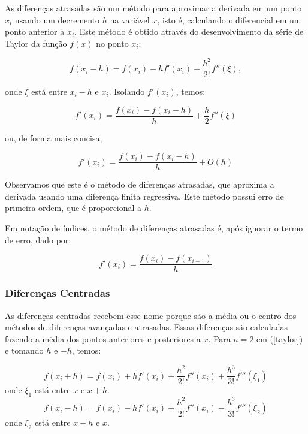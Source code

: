 As diferenças atrasadas são um método para aproximar a derivada em um ponto $x_i$ usando um decremento $h$ na variável $x$, isto é, calculando o diferencial em um ponto anterior a $x_i$. Este método é obtido através do desenvolvimento da série de Taylor da função $f(x)$ no ponto $x_i$:

\begin{equation*}
f(x_i-h)= f(x_i)- hf'(x_i) + \frac{h^2}{2!}f''(\xi),
\end{equation*}

onde $\xi$ está entre $x_i-h$ e $x_i$. Isolando $f'(x_i)$, temos:

\begin{equation*}
f'(x_i)= \frac{f(x_i)-f(x_i-h)}{h} + \frac{h}{2}f''(\xi)
\end{equation*}

ou, de forma mais concisa,

\begin{equation*}
f'(x_i)= \frac{f(x_i)-f(x_i-h)}{h} + O(h)
\end{equation*}

Observamos que este é o método de diferenças atrasadas, que aproxima a derivada usando uma diferença finita regressiva. Este método possui erro de primeira ordem, que é proporcional a $h$.

Em notação de índices, o método de diferenças atrasadas é, após ignorar o termo de erro, dado por:

\begin{equation}\label{backward_diff}
f'(x_i)= \frac{f(x_{i})-f(x_{i-1})}{h}
\end{equation}

\subsubsection{Diferenças Centradas}\label{sec:ct_diff}

As diferenças centradas recebem esse nome porque são a média ou o centro dos métodos de diferenças avançadas e atrasadas. Essas diferenças são calculadas fazendo a média dos pontos anteriores e posteriores a $x$. Para $n = 2$ em (\ref{taylor}) e tomando $h$ e $-h$, temos:

\begin{equation}\label{central_diff_forward}
f(x_i+h) = f(x_i) + hf'(x_i) + \frac{h^2}{2!}f''(x_i) + \frac{h^3}{3!}f'''(\xi_1)
\end{equation}
onde $\xi_1$ está entre $x$ e $x+h$.
\begin{equation}\label{central_diff_backward}
f(x_i-h) = f(x_i) - hf'(x_i) + \frac{h^2}{2!}f''(x_i) - \frac{h^3}{3!}f'''(\xi_2)
\end{equation}
onde $\xi_2$ está entre $x-h$ e $x$.

